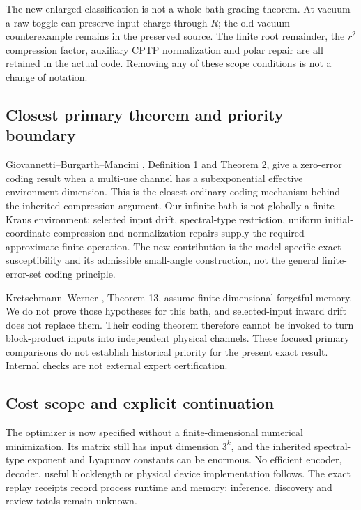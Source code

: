 \documentclass[11pt]{article}
\begin{document}
The new enlarged classification is not a whole-bath grading theorem.
At vacuum a raw toggle can preserve input charge through $R$; the old
vacuum counterexample remains in the preserved source. The finite root
remainder, the $r^2$ compression factor, auxiliary CPTP normalization and
polar repair are all retained in the actual code. Removing any of these
scope conditions is not a change of notation.

\subsection{Closest primary theorem and priority boundary}

Giovannetti--Burgarth--Mancini \cite{GBM}, Definition 1 and Theorem 2,
give a zero-error coding result when a multi-use channel has a
subexponential effective environment dimension. This is the closest
ordinary coding mechanism behind the inherited compression argument.
Our infinite bath is not globally a finite Kraus environment: selected
input drift, spectral-type restriction, uniform initial-coordinate
compression and normalization repairs supply the required approximate
finite operation. The new contribution is the model-specific exact
susceptibility and its admissible small-angle construction, not the
general finite-error-set coding principle.

Kretschmann--Werner \cite{KW}, Theorem 13, assume finite-dimensional
forgetful memory. We do not prove those hypotheses for this bath, and
selected-input inward drift does not replace them. Their coding theorem
therefore cannot be invoked to turn block-product inputs into independent
physical channels. These focused primary comparisons do not establish
historical priority for the present exact result. Internal checks are
not external expert certification.

\subsection{Cost scope and explicit continuation}

The optimizer is now specified without a finite-dimensional numerical
minimization. Its matrix still has input dimension $3^k$, and the
inherited spectral-type exponent and Lyapunov constants can be enormous.
No efficient encoder, decoder, useful blocklength or physical device
implementation follows. The exact replay receipts record process runtime
and memory; inference, discovery and review totals remain unknown.
\end{document}
